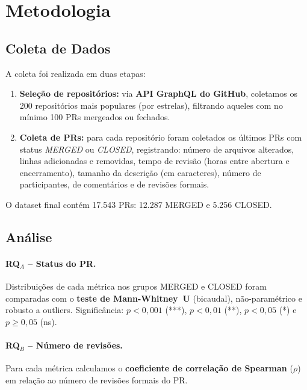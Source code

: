 \documentclass[10pt,a4paper,twocolumn]{article}
\begin{document}
\section{Metodologia}

\subsection{Coleta de Dados}

A coleta foi realizada em duas etapas:

\begin{enumerate}
  \item \textbf{Seleção de repositórios:} via \textbf{API GraphQL do GitHub},
    coletamos os 200 repositórios mais populares (por estrelas),
    filtrando aqueles com no mínimo 100 PRs mergeados ou fechados.

  \item \textbf{Coleta de PRs:} para cada repositório foram coletados os
    últimos PRs com status \textit{MERGED} ou \textit{CLOSED}, registrando:
    número de arquivos alterados, linhas adicionadas e removidas, tempo de
    revisão (horas entre abertura e encerramento), tamanho da descrição
    (em caracteres), número de participantes, de comentários e de revisões
    formais.
\end{enumerate}

O dataset final contém 17.543 PRs: 12.287 MERGED e
5.256 CLOSED.

\subsection{Análise}

\paragraph{RQ$_A$ -- Status do PR.}
Distribuições de cada métrica nos grupos MERGED e CLOSED foram comparadas
com o \textbf{teste de Mann-Whitney~U} (bicaudal), não-paramétrico e robusto
a outliers. Significância: $p < 0{,}001$ (***), $p < 0{,}01$ (**),
$p < 0{,}05$ (*) e $p \geq 0{,}05$ (ns).

\paragraph{RQ$_B$ -- Número de revisões.}
Para cada métrica calculamos o \textbf{coeficiente de correlação de
Spearman} ($\rho$) em relação ao número de revisões formais do PR.
\end{document}

